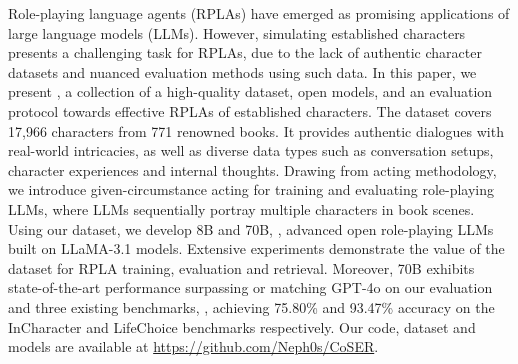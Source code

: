 Role-playing language agents (RPLAs) have emerged as promising applications of large language models (LLMs).
However, simulating established characters presents a challenging task for RPLAs, due to the lack of authentic character datasets and nuanced evaluation methods using such data. 
In this paper, we present \method, a collection of a high-quality dataset, open models, and an evaluation protocol towards effective RPLAs of established characters.  
The \method dataset covers 17,966 characters from 771 renowned books.
It provides authentic dialogues with real-world intricacies, as well as diverse data types such as conversation setups, character experiences and internal thoughts. 
Drawing from acting methodology, we introduce given-circumstance acting for training and evaluating role-playing LLMs, where LLMs sequentially portray multiple characters in book scenes.  
Using our dataset, we develop \method 8B and \method 70B, \ie, advanced open role-playing LLMs built on LLaMA-3.1 models.  
Extensive experiments demonstrate the value of the \method dataset for RPLA training, evaluation and retrieval. 
Moreover, \method 70B exhibits state-of-the-art performance surpassing or matching GPT-4o on our evaluation and three existing benchmarks, \ie, 
achieving 75.80\% and 93.47\% accuracy on the InCharacter and LifeChoice benchmarks respectively. 
Our code, dataset and models are available at \href{https://github.com/Neph0s/CoSER}{https://github.com/Neph0s/CoSER}.

